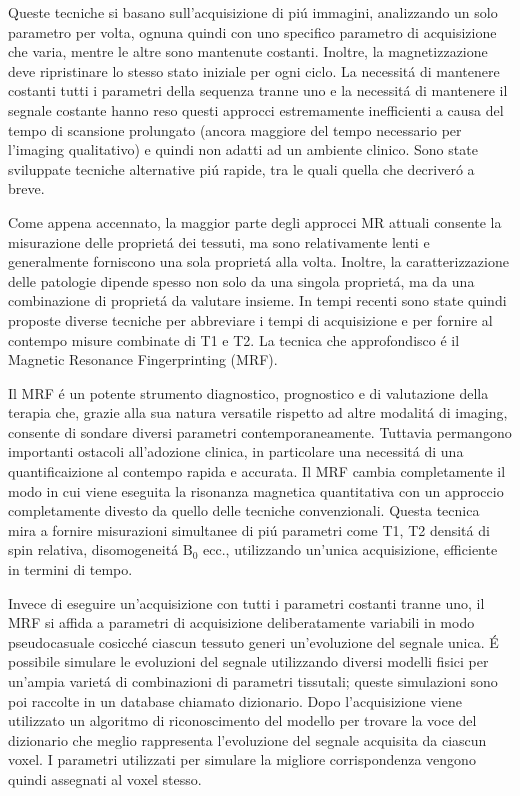 \documentclass[a4paper,12pt]{report}
\begin{document}
 Queste tecniche si basano sull'acquisizione di pi\'u immagini, analizzando un solo parametro per volta, ognuna quindi con uno specifico parametro di acquisizione che varia, mentre le altre sono mantenute costanti. 
 Inoltre, la magnetizzazione deve ripristinare lo stesso stato iniziale per ogni ciclo. 
 La necessit\'a di mantenere costanti tutti i parametri della sequenza tranne uno e la necessit\'a di mantenere il segnale costante hanno reso questi approcci estremamente inefficienti a causa del tempo di scansione prolungato (ancora maggiore del tempo necessario per l'imaging qualitativo) e quindi non adatti ad un ambiente clinico. 
 Sono state sviluppate tecniche alternative pi\'u rapide, tra le quali quella che decriver\'o a breve. 
 
 Come appena accennato, la maggior parte degli approcci MR attuali consente la misurazione delle propriet\'a dei tessuti, ma sono relativamente lenti e generalmente forniscono una sola propriet\'a alla volta. 
 Inoltre, la caratterizzazione delle patologie dipende spesso non solo da una singola propriet\'a, ma da una combinazione di propriet\'a da valutare insieme. 
 In tempi recenti sono state quindi proposte diverse tecniche per abbreviare i tempi di acquisizione e per fornire al contempo misure combinate di T1 e T2. 
 La tecnica che approfondisco \'e il Magnetic Resonance Fingerprinting (MRF). 
 
 Il MRF \'e un potente strumento diagnostico, prognostico e di valutazione della terapia che, grazie alla sua natura versatile rispetto ad altre modalit\'a di imaging, consente di sondare diversi parametri contemporaneamente. 
 Tuttavia permangono importanti ostacoli all'adozione clinica, in particolare una necessit\'a di una quantificaizione al contempo rapida e accurata. 
 Il MRF cambia completamente il modo in cui viene eseguita la risonanza magnetica quantitativa con un approccio completamente divesto da quello delle tecniche convenzionali. 
 Questa tecnica mira a fornire misurazioni simultanee di pi\'u parametri come T1, T2 densit\'a di spin relativa, disomogeneit\'a $\mbox{B}_0$ ecc., utilizzando un'unica acquisizione, efficiente in termini di tempo. 
 
 Invece di eseguire un'acquisizione con tutti i parametri costanti tranne uno, il MRF si affida a parametri di acquisizione deliberatamente variabili in modo pseudocasuale cosicch\'e ciascun tessuto generi un'evoluzione del segnale unica. 
 \'E possibile simulare le evoluzioni del segnale utilizzando diversi modelli fisici per un'ampia variet\'a di combinazioni di parametri tissutali; queste simulazioni sono poi raccolte in un database chiamato dizionario. 
 Dopo l'acquisizione viene utilizzato un algoritmo di riconoscimento del modello per trovare la voce del dizionario che meglio rappresenta l'evoluzione del segnale acquisita da ciascun voxel. 
 I parametri utilizzati per simulare la migliore corrispondenza vengono quindi assegnati al voxel stesso. 
 
\end{document}
